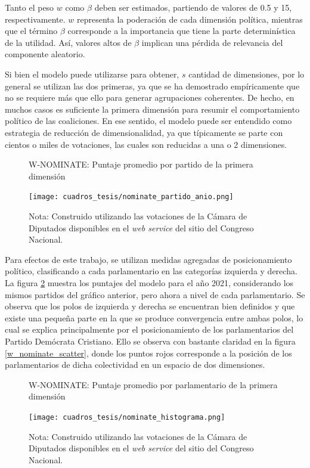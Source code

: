 \documentclass[
  12pt,
]{article}
\begin{document}
Tanto el peso \(w\) como \(\beta\) deben ser estimados, partiendo de
valores de 0.5 y 15, respectivamente. \(w\) representa la poderación de
cada dimensión política, mientras que el término \(\beta\) corresponde a
la importancia que tiene la parte determinística de la utilidad. Así,
valores altos de \(\beta\) implican una pérdida de relevancia del
componente aleatorio.

Si bien el modelo puede utilizarse para obtener, \(s\) cantidad de
dimensiones, por lo general se utilizan las dos primeras, ya que se ha
demostrado empíricamente que no se requiere más que ello para generar
agrupaciones coherentes. De hecho, en muchos casos es suficiente la
primera dimensión para resumir el comportamiento político de las
coaliciones. En ese sentido, el modelo puede ser entendido como
estrategia de reducción de dimensionalidad, ya que típicamente se parte
con cientos o miles de votaciones, las cuales son reducidas a una o 2
dimensiones.

\begin{figure}[H]
\centering
\large
\caption{W-NOMINATE: Puntaje promedio por partido de la primera dimensión}
\label{w_nominate_plot}
\texttt{[image: cuadros\_tesis/nominate\_partido\_anio.png]}
     \caption*{\footnotesize{{Nota: Construido utilizando las votaciones de la Cámara de Diputados disponibles en el \textit{web service} del sitio del Congreso Nacional.} }}
\normalsize
\end{figure}

Para efectos de este trabajo, se utilizan medidas agregadas de
posicionamiento político, clasificando a cada parlamentario en las
categorías izquierda y derecha. La figura \ref{w_nominate_hist} muestra
los puntajes del modelo para el año 2021, considerando los mismos
partidos del gráfico anterior, pero ahora a nivel de cada parlamentario.
Se observa que los polos de izquierda y derecha se encuentran bien
definidos y que existe una pequeña parte en la que se produce
convergencia entre ambas polos, lo cual se explica principalmente por el
posicionamiento de los parlamentarios del Partido Demócrata Cristiano.
Ello se observa con bastante claridad en la figura
\ref{w_nominate_scatter}, donde los puntos rojos corresponde a la
posición de los parlamentarios de dicha colectividad en un espacio de
dos dimensiones.

\begin{figure}[H]
\centering
\large
\caption{W-NOMINATE: Puntaje promedio por parlamentario de la primera dimensión}
\label{w_nominate_hist}
\texttt{[image: cuadros\_tesis/nominate\_histograma.png]}
     \caption*{\footnotesize{{Nota: Construido utilizando las votaciones de la Cámara de Diputados disponibles en el \textit{web service} del sitio del Congreso Nacional.} }}

\normalsize
\end{figure}
\end{document}
